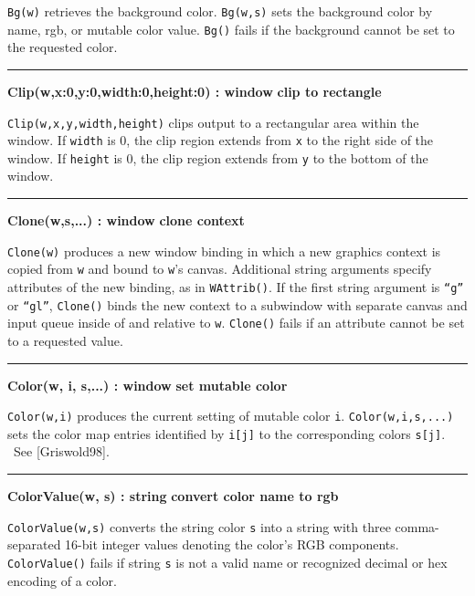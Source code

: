 \noindent
\texttt{Bg(w)} retrieves the background color. \texttt{Bg(w,s)} sets the
background color by name, rgb, or mutable color value. \texttt{Bg()}
fails if the background cannot be set to the requested color.

\bigskip\hrule\vspace{0.1cm}
\noindent
{\bf Clip(w,x:0,y:0,width:0,height:0) : window } \hfill {\bf clip to rectangle}

\noindent
\texttt{Clip(w,x,y,width,height)} clips output to a rectangular area
within the window. If \texttt{width} is 0, the clip region extends
from \texttt{x} to the right side of the window. If \texttt{height}
is 0, the clip region extends from \texttt{y} to the bottom of the
window.

\bigskip\hrule\vspace{0.1cm}
\noindent
{\bf Clone(w,s,...) : window } \hfill {\bf clone context}

\noindent
\texttt{Clone(w)} produces a new window binding in which a new graphics
context is copied from \texttt{w} and bound to
\texttt{w}'s canvas. Additional string arguments
specify attributes of the new binding, as in \texttt{WAttrib()}. If the
first string argument is
\texttt{{\textquotedblleft}g{\textquotedblright}} or
\texttt{{\textquotedblleft}gl{\textquotedblright}}, \texttt{Clone()}
binds the new context to a subwindow with separate canvas and input
queue inside of and relative to \texttt{w}. \texttt{Clone()} fails if
an attribute cannot be set to a requested value.

\bigskip\hrule\vspace{0.1cm}
\noindent
{\bf Color(w, i, s,...) : window } \hfill {\bf set mutable color}

\noindent
\texttt{Color(w,i)} produces the current setting of mutable color
\texttt{i}. \texttt{Color(w,i,s,...)} sets the color map entries
identified by \texttt{i[j]} to the corresponding colors \texttt{s[j]}.
\ See [Griswold98].

\bigskip\hrule\vspace{0.1cm}
\noindent
{\bf ColorValue(w, s) : string } \hfill {\bf convert color name to rgb}

\noindent
\texttt{ColorValue(w,s)} converts the string color \texttt{s} into a
string with three comma-separated 16-bit integer values denoting the
color's RGB components. \texttt{ColorValue()} fails if
string \texttt{s} is not a valid name or recognized decimal or hex
encoding of a color.

